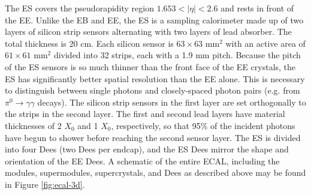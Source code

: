 The ES covers the pseudorapidity region $1.653 < |\eta| < 2.6$ and rests
in front of the EE.  Unlike the EB and EE, 
the ES is a sampling calorimeter made up of two layers of silicon strip sensors 
alternating with two layers of lead absorber.  The total thickness is 20 cm.
Each silicon sensor is $63\times63$  $\text{mm}^2$ with an active area of 
$61\times61$  $\text{mm}^2$ divided into 32 strips, each with a 1.9 mm pitch.
Because the pitch of the ES sensors is so much thinner than the front face of the EE crystals,
the ES has significantly better spatial resolution than the EE alone.
This is necessary to distinguish between single photons and closely-spaced photon pairs
(e.g. from $\pi^0 \rightarrow \gamma\gamma$ decays).
The silicon strip sensors in the first layer are set orthogonally to the strips in the second layer. 
The first and second lead layers have material thicknesses of 2 $X_0$ and 1 
$X_0$, respectively, so that 95\% of the incident photons have begun to shower
before reaching the second sensor layer.  
The ES is divided into four Dees (two Dees per endcap), and the ES Dees
mirror the shape and orientation of the EE Dees.
A schematic of the entire ECAL, including the modules, supermodules, supercrystals, and Dees
as described above may be found in Figure \ref{fig:ecal-3d}.


